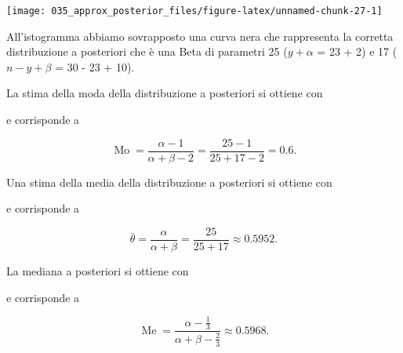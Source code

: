 \documentclass[
]{memoir}
\newenvironment{Shaded}{\begin{snugshade}}{\end{snugshade}}
\newcommand{\CommentTok}[1]{\textcolor[rgb]{0.56,0.35,0.01}{\textit{#1}}}
\newcommand{\FunctionTok}[1]{\textcolor[rgb]{0.00,0.00,0.00}{#1}}
\newcommand{\NormalTok}[1]{#1}
\newcommand{\SpecialCharTok}[1]{\textcolor[rgb]{0.00,0.00,0.00}{#1}}
\DeclareMathOperator{\Me}{Me} %
\DeclareMathOperator{\Mo}{Mo} %
\begin{document}
\begin{center}\texttt{[image: 035\_approx\_posterior\_files/figure-latex/unnamed-chunk-27-1]} \end{center}

\noindent
All'istogramma abbiamo sovrapposto una curva nera che rappresenta la corretta distribuzione a posteriori che è una Beta di parametri 25 (\(y + \alpha\) = 23 + 2) e 17 (\(n - y + \beta\) = 30 - 23 + 10).

La stima della moda della distribuzione a posteriori si ottiene con

\begin{Shaded}
\end{Shaded}

\noindent e corrisponde a

\[
\Mo = \frac{\alpha -1}{\alpha + \beta - 2} = \frac{25 - 1}{25 + 17 - 2} = 0.6.
\]

Una stima della media della distribuzione a posteriori si ottiene con

\begin{Shaded}
\end{Shaded}

\noindent e corrisponde a

\[
\bar{\theta} = \frac{\alpha}{\alpha + \beta} = \frac{25}{25 + 17} \approx 0.5952.
\]

La mediana a posteriori si ottiene con

\begin{Shaded}
\end{Shaded}

\noindent e corrisponde a

\[
\Me = \frac{\alpha - \frac{1}{3}}{\alpha + \beta - \frac{2}{3}} \approx 0.5968.
\]
\end{document}
